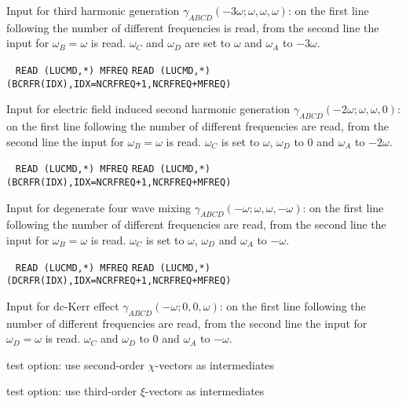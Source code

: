 \begin{description}
Input for third harmonic generation 
$\gamma_{ABCD}(-3\omega;\omega,\omega,\omega)$:
on the first line following  the number of different
frequencies is read, from the second line the input for
$\omega_B = \omega$ is read. $\omega_C$ and $\omega_D$ are set to 
$\omega$ and $\omega_A$ to $-3\omega$. 
 
\item[\Key{ESHGFR}] \verb| |\newline
\verb|READ (LUCMD,*) MFREQ|\newline
\verb|READ (LUCMD,*) (BCRFR(IDX),IDX=NCRFREQ+1,NCRFREQ+MFREQ)|

Input for electric field induced second harmonic generation 
$\gamma_{ABCD}(-2\omega;\omega,\omega,0)$:
on the first line following  the number of different
frequencies are read, from the second line the input for
$\omega_B = \omega$ is read. $\omega_C$ is set to $\omega$,
$\omega_D$ to $0$ and $\omega_A$ to $-2\omega$. 
 
\item[\Key{DFWMFR}] \verb| |\newline
\verb|READ (LUCMD,*) MFREQ|\newline
\verb|READ (LUCMD,*) (BCRFR(IDX),IDX=NCRFREQ+1,NCRFREQ+MFREQ)|

Input for degenerate four wave mixing 
$\gamma_{ABCD}(-\omega;\omega,\omega,-\omega)$:
on the first line following  the number of different
frequencies are read, from the second line the input for
$\omega_B = \omega$ is read. $\omega_C$ is set to $\omega$,
$\omega_D$ and $\omega_A$ to $-\omega$. 
 
\item[\Key{DCKERR}] \verb| |\newline
\verb|READ (LUCMD,*) MFREQ|\newline
\verb|READ (LUCMD,*) (DCRFR(IDX),IDX=NCRFREQ+1,NCRFREQ+MFREQ)|

Input for dc-Kerr effect $\gamma_{ABCD}(-\omega;0,0,\omega)$:
on the first line following  the number of different
frequencies are read, from the second line the input for
$\omega_D = \omega$ is read. $\omega_C$ and $\omega_D$ to $0$
and $\omega_A$ to $-\omega$. 
 
\item[\Key{USECHI}]
test option: use second-order $\chi$-vectors as intermediates
 
\item[\Key{USEXKS}] 
test option: use third-order $\xi$-vectors as intermediates
 

\end{description}
